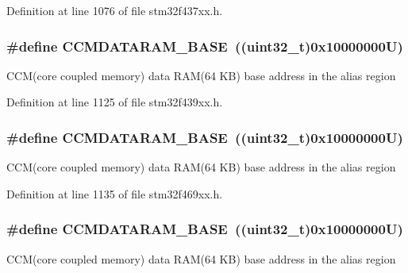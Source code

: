 Definition at line 1076 of file stm32f437xx.\+h.

\subsubsection[{\texorpdfstring{C\+C\+M\+D\+A\+T\+A\+R\+A\+M\+\_\+\+B\+A\+SE}{CCMDATARAM_BASE}}]{\setlength{\rightskip}{0pt plus 5cm}\#define C\+C\+M\+D\+A\+T\+A\+R\+A\+M\+\_\+\+B\+A\+SE~((uint32\+\_\+t)0x10000000\+U)}\hypertarget{group___peripheral__memory__map_gabea1f1810ebeac402164b42ab54bcdf9}{}\label{group___peripheral__memory__map_gabea1f1810ebeac402164b42ab54bcdf9}
C\+C\+M(core coupled memory) data R\+A\+M(64 K\+B) base address in the alias region 

Definition at line 1125 of file stm32f439xx.\+h.

\subsubsection[{\texorpdfstring{C\+C\+M\+D\+A\+T\+A\+R\+A\+M\+\_\+\+B\+A\+SE}{CCMDATARAM_BASE}}]{\setlength{\rightskip}{0pt plus 5cm}\#define C\+C\+M\+D\+A\+T\+A\+R\+A\+M\+\_\+\+B\+A\+SE~((uint32\+\_\+t)0x10000000\+U)}\hypertarget{group___peripheral__memory__map_gabea1f1810ebeac402164b42ab54bcdf9}{}\label{group___peripheral__memory__map_gabea1f1810ebeac402164b42ab54bcdf9}
C\+C\+M(core coupled memory) data R\+A\+M(64 K\+B) base address in the alias region 

Definition at line 1135 of file stm32f469xx.\+h.

\subsubsection[{\texorpdfstring{C\+C\+M\+D\+A\+T\+A\+R\+A\+M\+\_\+\+B\+A\+SE}{CCMDATARAM_BASE}}]{\setlength{\rightskip}{0pt plus 5cm}\#define C\+C\+M\+D\+A\+T\+A\+R\+A\+M\+\_\+\+B\+A\+SE~((uint32\+\_\+t)0x10000000\+U)}\hypertarget{group___peripheral__memory__map_gabea1f1810ebeac402164b42ab54bcdf9}{}\label{group___peripheral__memory__map_gabea1f1810ebeac402164b42ab54bcdf9}
C\+C\+M(core coupled memory) data R\+A\+M(64 K\+B) base address in the alias region 


